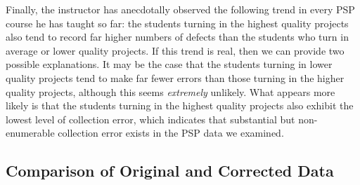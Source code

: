 Finally, the instructor has anecdotally observed the following trend in
every PSP course he has taught so far: the students turning in the highest
quality projects also tend to record far higher numbers of defects than the
students who turn in average or lower quality projects.  If this trend is
real, then we can provide two possible explanations. It may be the case
that the students turning in lower quality projects tend to make far fewer
errors than those turning in the higher quality projects, although this
seems {\em extremely} unlikely.  What appears more likely is that the
students turning in the highest quality projects also exhibit the lowest
level of collection error, which indicates that substantial but
non-enumerable collection error exists in the PSP data we examined.


\subsection{Comparison of Original and Corrected Data}


